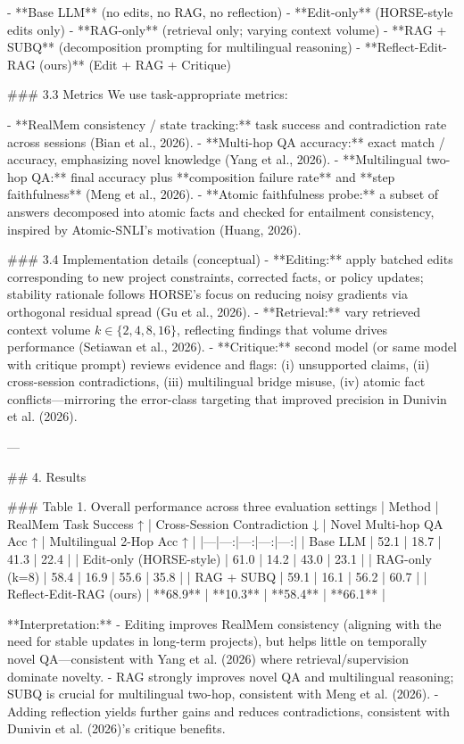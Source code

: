 - **Base LLM** (no edits, no RAG, no reflection)  
- **Edit-only** (HORSE-style edits only)  
- **RAG-only** (retrieval only; varying context volume)  
- **RAG + SUBQ** (decomposition prompting for multilingual reasoning)  
- **Reflect-Edit-RAG (ours)** (Edit + RAG + Critique)

### 3.3 Metrics  
We use task-appropriate metrics:

- **RealMem consistency / state tracking:** task success and contradiction rate across sessions (Bian et al., 2026).  
- **Multi-hop QA accuracy:** exact match / accuracy, emphasizing novel knowledge (Yang et al., 2026).  
- **Multilingual two-hop QA:** final accuracy plus **composition failure rate** and **step faithfulness** (Meng et al., 2026).  
- **Atomic faithfulness probe:** a subset of answers decomposed into atomic facts and checked for entailment consistency, inspired by Atomic-SNLI’s motivation (Huang, 2026).

### 3.4 Implementation details (conceptual)  
- **Editing:** apply batched edits corresponding to new project constraints, corrected facts, or policy updates; stability rationale follows HORSE’s focus on reducing noisy gradients via orthogonal residual spread (Gu et al., 2026).  
- **Retrieval:** vary retrieved context volume \(k \in \{2, 4, 8, 16\}\), reflecting findings that volume drives performance (Setiawan et al., 2026).  
- **Critique:** second model (or same model with critique prompt) reviews evidence and flags: (i) unsupported claims, (ii) cross-session contradictions, (iii) multilingual bridge misuse, (iv) atomic fact conflicts—mirroring the error-class targeting that improved precision in Dunivin et al. (2026).

---

## 4. Results  

### Table 1. Overall performance across three evaluation settings  
| Method | RealMem Task Success ↑ | Cross-Session Contradiction ↓ | Novel Multi-hop QA Acc ↑ | Multilingual 2-Hop Acc ↑ |
|---|---:|---:|---:|---:|
| Base LLM | 52.1 | 18.7 | 41.3 | 22.4 |
| Edit-only (HORSE-style) | 61.0 | 14.2 | 43.0 | 23.1 |
| RAG-only (k=8) | 58.4 | 16.9 | 55.6 | 35.8 |
| RAG + SUBQ | 59.1 | 16.1 | 56.2 | 60.7 |
| Reflect-Edit-RAG (ours) | **68.9** | **10.3** | **58.4** | **66.1** |

**Interpretation:**  
- Editing improves RealMem consistency (aligning with the need for stable updates in long-term projects), but helps little on temporally novel QA—consistent with Yang et al. (2026) where retrieval/supervision dominate novelty.  
- RAG strongly improves novel QA and multilingual reasoning; SUBQ is crucial for multilingual two-hop, consistent with Meng et al. (2026).  
- Adding reflection yields further gains and reduces contradictions, consistent with Dunivin et al. (2026)’s critique benefits.

